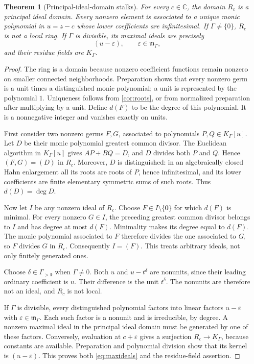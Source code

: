 \documentclass[11pt,letterpaper]{article}
\newtheorem{theorem}{Theorem}[section]
\theoremstyle{definition}
\theoremstyle{remark}
\newcommand{\C}{\mathbb C}
\newcommand{\KK}{K_\Gamma}
\newcommand{\mm}{\mathfrak m_\Gamma}
\numberwithin{equation}{section}
\begin{document}
\begin{theorem}[Principal-ideal-domain stalks]\label{thm:PID}
For every $c\in\C$, the domain $R_c$ is a principal ideal domain. Every nonzero element is associated to a unique monic polynomial in $u=z-c$ whose lower coefficients are infinitesimal. If $\Gamma\ne\{0\}$, $R_c$ is not a local ring. If $\Gamma$ is divisible, its maximal ideals are precisely
\begin{equation}\label{eq:maxideals}
 (u-\varepsilon),\qquad \varepsilon\in\mm,
\end{equation}
and their residue fields are $\KK$.
\end{theorem}
\begin{proof}
The ring is a domain because nonzero coefficient functions remain nonzero on smaller connected neighborhoods. Preparation shows that every nonzero germ is a unit times a distinguished monic polynomial; a unit is represented by the polynomial $1$. Uniqueness follows from \cref{cor:roots}, or from normalized preparation after multiplying by a unit. Define $d(F)$ to be the degree of this polynomial. It is a nonnegative integer and vanishes exactly on units.

First consider two nonzero germs $F,G$, associated to polynomials $P,Q\in\KK[u]$. Let $D$ be their monic polynomial greatest common divisor. The Euclidean algorithm in $\KK[u]$ gives $A P+B Q=D$, and $D$ divides both $P$ and $Q$. Hence $(F,G)=(D)$ in $R_c$. Moreover, $D$ is distinguished: in an algebraically closed Hahn enlargement all its roots are roots of $P$, hence infinitesimal, and its lower coefficients are finite elementary symmetric sums of such roots. Thus $d(D)=\deg D$.

Now let $I$ be any nonzero ideal of $R_c$. Choose $F\in I\setminus\{0\}$ for which $d(F)$ is minimal. For every nonzero $G\in I$, the preceding greatest common divisor belongs to $I$ and has degree at most $d(F)$. Minimality makes its degree equal to $d(F)$. The monic polynomial associated to $F$ therefore divides the one associated to $G$, so $F$ divides $G$ in $R_c$. Consequently $I=(F)$. This treats arbitrary ideals, not only finitely generated ones.

Choose $\delta\in\Gamma_{>0}$ when $\Gamma\ne0$. Both $u$ and $u-t^\delta$ are nonunits, since their leading ordinary coefficient is $u$. Their difference is the unit $t^\delta$. The nonunits are therefore not an ideal, and $R_c$ is not local.

If $\Gamma$ is divisible, every distinguished polynomial factors into linear factors $u-\varepsilon$ with $\varepsilon\in\mm$. Each such factor is a nonunit and is irreducible, by degree. A nonzero maximal ideal in the principal ideal domain must be generated by one of these factors. Conversely, evaluation at $c+\varepsilon$ gives a surjection $R_c\to\KK$, because constants are available. Preparation and polynomial division show that its kernel is $(u-\varepsilon)$. This proves both \eqref{eq:maxideals} and the residue-field assertion.
\end{proof}
\end{document}
